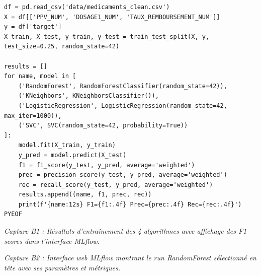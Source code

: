 \documentclass[12pt,a4paper]{report}
\begin{document}
\begin{center}
\begin{minipage}{0.9\textwidth}
{\begin{minipage}{0.95\textwidth}
\begin{verbatim}
df = pd.read_csv('data/medicaments_clean.csv')
X = df[['PPV_NUM', 'DOSAGE1_NUM', 'TAUX_REMBOURSEMENT_NUM']]
y = df['target']
X_train, X_test, y_train, y_test = train_test_split(X, y, test_size=0.25, random_state=42)

results = []
for name, model in [
    ('RandomForest', RandomForestClassifier(random_state=42)),
    ('KNeighbors', KNeighborsClassifier()),
    ('LogisticRegression', LogisticRegression(random_state=42, max_iter=1000)),
    ('SVC', SVC(random_state=42, probability=True))
]:
    model.fit(X_train, y_train)
    y_pred = model.predict(X_test)
    f1 = f1_score(y_test, y_pred, average='weighted')
    prec = precision_score(y_test, y_pred, average='weighted')
    rec = recall_score(y_test, y_pred, average='weighted')
    results.append((name, f1, prec, rec))
    print(f'{name:12s} F1={f1:.4f} Prec={prec:.4f} Rec={rec:.4f}')
PYEOF
            \end{verbatim}
            \begin{minipage}{0.45\textwidth}
                \centering
            \end{minipage}
        \end{minipage}}
    \end{minipage}
\end{center}
\noindent\textit{Capture B1 : Résultats d'entraînement des 4 algorithmes avec affichage des F1 scores dans l'interface MLflow.}

\begin{center}
    \begin{minipage}{0.9\textwidth}
        \centering
    \end{minipage}
\end{center}
\noindent\textit{Capture B2 : Interface web MLflow montrant le run RandomForest sélectionné en tête avec ses paramètres et métriques.}
\end{document}
